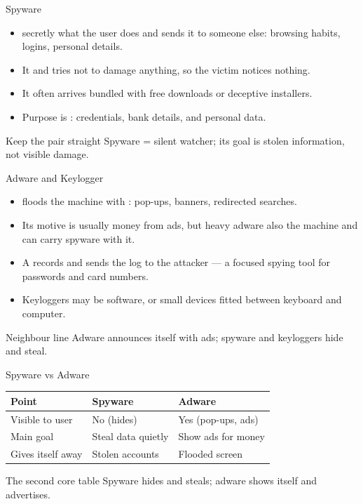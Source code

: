 \documentclass[aspectratio=169]{beamer}
\begin{document}
\begin{frame}{Spyware}
  \begin{itemize}
    \item {} secretly  what the user does and sends
      it to someone else: browsing habits, logins, personal details.
    \item It  and tries not to damage anything, so the
      victim notices nothing.
    \item It often arrives bundled with free downloads or deceptive
      installers.
    \item Purpose is : credentials, bank details,
      and personal data.
  \end{itemize}
  \begin{block}{Keep the pair straight}
    Spyware = silent watcher; its goal is stolen information, not visible
    damage.
  \end{block}
\end{frame}

\begin{frame}{Adware and Keylogger}
  \begin{itemize}
    \item {} floods the machine with :
      pop-ups, banners, redirected searches.
    \item Its motive is usually money from ads, but heavy adware also
       the machine and can carry spyware with it.
    \item A  records  and sends the
      log to the attacker --- a focused spying tool for passwords and card
      numbers.
    \item Keyloggers may be software, or small  devices fitted
      between keyboard and computer.
  \end{itemize}
  \begin{block}{Neighbour line}
    Adware announces itself with ads; spyware and keyloggers hide and steal.
  \end{block}
\end{frame}

\begin{frame}{Spyware vs Adware}
  \begin{center}
    \begin{tabular}{lll}
      \toprule
      \textbf{Point} & \textbf{Spyware} & \textbf{Adware} \\
      \midrule
      Visible to user & No (hides) & Yes (pop-ups, ads) \\
      Main goal & Steal data quietly & Show ads for money \\
      Gives itself away & Stolen accounts & Flooded screen \\
      \bottomrule
    \end{tabular}
  \end{center}
  \vspace{0.35cm}
  \begin{alertblock}{The second core table}
    Spyware hides and steals; adware shows itself and advertises.
  \end{alertblock}
\end{frame}
\end{document}
